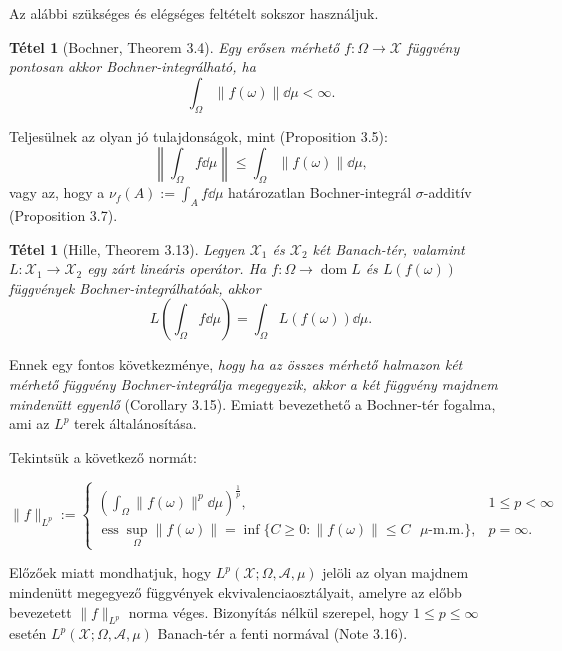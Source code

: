 \documentclass{beamer} %
\newtheorem{theo}[lem]{Tétel}
\DeclareMathOperator{\dom}{dom}
\DeclareMathOperator{\ess}{ess}
\begin{document}
\begin{frame}
\justifying
Az alábbi szükséges és elégséges feltételt sokszor használjuk.
\begin{theo}[Bochner, Theorem 3.4] Egy erősen mérhető $f \colon \Omega \to \mathcal{X}$ függvény pontosan akkor Bochner-integrálható, ha
$$\int_{\Omega} \| f(\omega) \| \dd{\mu} < \infty.$$
\end{theo}
\pause Teljesülnek az olyan jó tulajdonságok, mint (Proposition 3.5):
$$\left \| \int_{\Omega} f \dd{\mu} \right\| \leqslant \int_{\Omega} \| f(\omega) \| \dd{\mu},$$
\pause vagy az, hogy a $\nu_f(A) := \int_{A} f \dd{\mu}$ határozatlan Bochner-integrál $\sigma$-additív (Proposition 3.7).
\end{frame}

\begin{frame}
\justifying
\begin{theo}[Hille, Theorem 3.13] Legyen $\mathcal{X}_1$ és $\mathcal{X}_2$ két Banach-tér, valamint $L \colon \mathcal{X}_1 \to \mathcal{X}_2$ egy zárt lineáris operátor. Ha $f \colon \Omega \to \dom L$ és $L(f(\omega))$ függvények Bochner-integrálhatóak, akkor
$$L\left(\int_{\Omega} f \dd{\mu} \right) = \int_{\Omega} L(f(\omega)) \dd{\mu}.$$
\end{theo}
\pause Ennek egy fontos következménye, \textit{hogy ha az összes mérhető halmazon két mérhető függvény Bochner-integrálja megegyezik, akkor a két függvény majdnem mindenütt egyenlő} (Corollary 3.15). \pause Emiatt bevezethető a Bochner-tér fogalma, ami az $L^p$ terek általánosítása.

\pause Tekintsük a következő normát:

\begin{displaymath}
 \| f \|_{L^p} := \left\{
    \begin{array}{ll}
      \left(\int_{\Omega} \| f(\omega) \|^p  \dd{\mu} \right)^{\frac{1}{p}}, &  1 \leqslant p < \infty \\
      \ess\sup_{\Omega} \|f(\omega)\| = \inf \lbrace C \geqslant 0 : \|f(\omega)\| \leqslant C \text{ $\mu$-m.m.} \rbrace, &  p = \infty.
    \end{array}
  \right.
\end{displaymath}
\end{frame}

\begin{frame} 
\justifying
Előzőek miatt mondhatjuk, hogy $L^p(\mathcal{X}; \Omega, \mathcal{A}, \mu)$ jelöli az olyan majdnem mindenütt megegyező függvények ekvivalenciaosztályait, amelyre az előbb bevezetett $\| f \|_{L^p}$ norma véges. \pause Bizonyítás nélkül szerepel, hogy $1 \leqslant p \leqslant \infty$ esetén $L^p(\mathcal{X}; \Omega, \mathcal{A}, \mu)$ Banach-tér a fenti normával (Note 3.16).
\end{frame}
\end{document}
